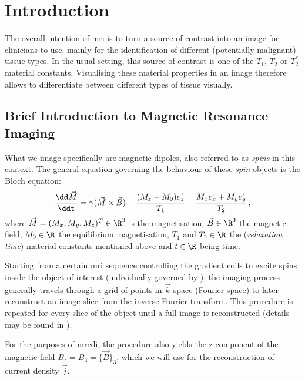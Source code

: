 \documentclass[12pt]{article}
\begin{document}
  \section{Introduction}
  The overall intention of \gls{mri} is to turn a source of contrast into an image for clinicians to use, mainly for the identification of different (potentially malignant) tissue types.
  In the usual setting, this source of contrast is one of the $T_1$, $T_2$ or $T_2^*$ material constants.
  Visualising these material properties in an image therefore allows to differentiate between different types of tissue visually.

  \subsection{Brief Introduction to Magnetic Resonance Imaging}
  What we image specifically are magnetic dipoles, also referred to as \textit{spins} in this context.
  The general equation governing the behaviour of these \textit{spin} objects is the Bloch equation:
  \begin{equation}
    \frac{\dd \vec{M}}{\ddt} = \gamma (\vec{M} \times \vec{B}) - \frac{(M_z - M_0) \vec{e_z}}{T_1} - \frac{M_x \vec{e_x} + M_y \vec{e_y}}{T_2}\,,
    \label{eq:bloch}
  \end{equation}
  where $\vec{M} = (M_x, M_y, M_z)^T \in \R^3$ is the magnetisation, $\vec{B} \in \R^3$ the magnetic field, $M_0 \in \R$ the equilibrium magnetisation, $T_1$ and $T_2 \in \R$ the (\textit{relaxation time}) material constants mentioned above and $t \in \R$ being time.

  Starting from a certain \gls{mri} sequence controlling the gradient coils to excite spins inside the object of interest (individually governed by ), the imaging process generally travels through a grid of points in $\vec{k}$-space (Fourier space) to later reconstruct an image slice from the inverse Fourier transform.
  This procedure is repeated for every slice of the object until a full image is reconstructed (details may be found in \cite{1996-mri-basics}).

  For the purposes of \gls{mrcdi}, the procedure also yields the z-component of the magnetic field $B_z = B_3 = \{\vec{B}\}_3$, which we will use for the reconstruction of current density $\vec{j}$.
\end{document}
